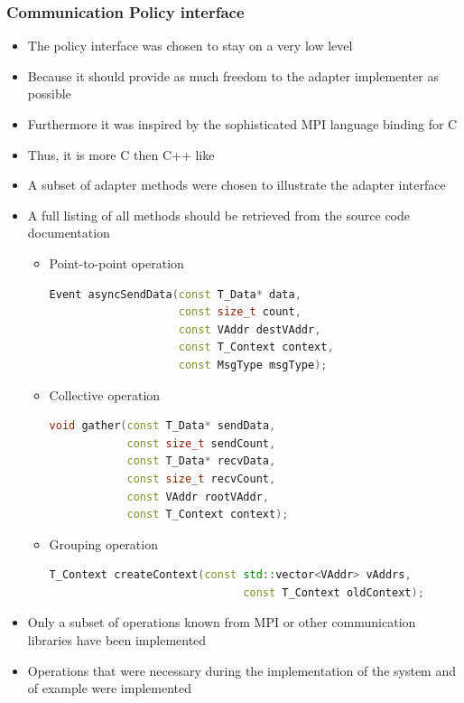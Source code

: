 \subsubsection{Communication Policy interface}
\label{sec:impl:policy_interface}
\begin{itemize}
\item The policy interface was chosen to stay on a very low level
\item Because it should provide as much freedom to the adapter
  implementer as possible
\item Furthermore it was inspired by the sophisticated MPI language
  binding for C
\item Thus, it is more C then C++ like

\item A subset of adapter methods were chosen to
  illustrate the adapter interface

\item A full listing of all methods should be retrieved from
  the source code documentation

  \begin{itemize}
  \item Point-to-point operation\\
    \begin{lstlisting}[language=C++, breaklines=false, label={}]
Event asyncSendData(const T_Data* data,
                    const size_t count,
                    const VAddr destVAddr,
                    const T_Context context,
                    const MsgType msgType);
    \end{lstlisting}

  \item Collective operation\\
    \begin{lstlisting}[language=C++, breaklines=false, label={}]
void gather(const T_Data* sendData,
            const size_t sendCount,
            const T_Data* recvData,
            const size_t recvCount,
            const VAddr rootVAddr,
            const T_Context context);
    \end{lstlisting}
  \item Grouping operation\\
    \begin{lstlisting}[language=C++, breaklines=false, label={}]
      T_Context createContext(const std::vector<VAddr> vAddrs,
                              const T_Context oldContext);
    \end{lstlisting}
    
  \end{itemize}

\item Only a subset of operations known from MPI or other
  communication libraries have been implemented

\item Operations that were necessary during the implementation
  of the system and of example were implemented
  
\end{itemize}

